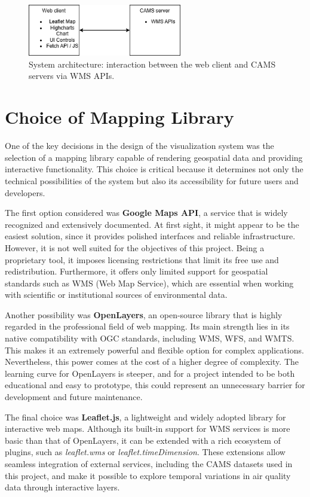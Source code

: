 \begin{figure}[h!btp]
	\centering
	\includegraphics[width=0.6\textwidth]{fig/diagrama1.png}
	\caption{System architecture: interaction between the web client and CAMS servers via WMS APIs.}
	\label{fig:architecture}
\end{figure}

\section{Choice of Mapping Library}

One of the key decisions in the design of the visualization system was the selection of a mapping library capable of rendering geospatial data and providing interactive functionality. This choice is critical because it determines not only the technical possibilities of the system but also its accessibility for future users and developers.  

The first option considered was \textbf{Google Maps API}, a service that is widely recognized and extensively documented. At first sight, it might appear to be the easiest solution, since it provides polished interfaces and reliable infrastructure. However, it is not well suited for the objectives of this project. Being a proprietary tool, it imposes licensing restrictions that limit its free use and redistribution. Furthermore, it offers only limited support for geospatial standards such as WMS (Web Map Service), which are essential when working with scientific or institutional sources of environmental data.  

Another possibility was \textbf{OpenLayers}, an open-source library that is highly regarded in the professional field of web mapping. Its main strength lies in its native compatibility with OGC standards, including WMS, WFS, and WMTS. This makes it an extremely powerful and flexible option for complex applications. Nevertheless, this power comes at the cost of a higher degree of complexity. The learning curve for OpenLayers is steeper, and for a project intended to be both educational and easy to prototype, this could represent an unnecessary barrier for development and future maintenance.  

The final choice was \textbf{Leaflet.js}, a lightweight and widely adopted library for interactive web maps. Although its built-in support for WMS services is more basic than that of OpenLayers, it can be extended with a rich ecosystem of plugins, such as \textit{leaflet.wms} or \textit{leaflet.timeDimension}. These extensions allow seamless integration of external services, including the CAMS datasets used in this project, and make it possible to explore temporal variations in air quality data through interactive layers.  

